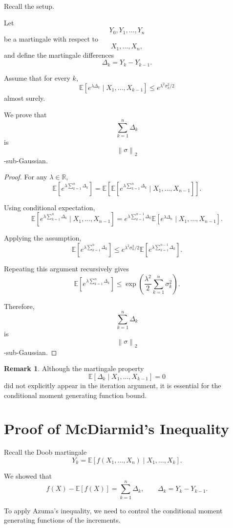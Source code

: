 \documentclass[12pt,oneside]{book}
\numberwithin{equation}{section}
\theoremstyle{definition}
\newtheorem{remark}{Remark}[section]
\theoremstyle{plain}
\theoremstyle{remark}
\newcommand{\R}{\mathbb{R}}
\newcommand{\E}{\mathbb{E}}
\newcommand{\norm}[1]{\left\lVert #1 \right\rVert}
\begin{document}
Recall the setup.

Let
\[
Y_0,Y_1,\dots,Y_n
\]
be a martingale with respect to
\[
X_1,\dots,X_n,
\]
and define the martingale differences
\[
\Delta_k
=
Y_k-Y_{k-1}.
\]

Assume that for every $k$,
\[
\E\left[
e^{\lambda \Delta_k}
\mid
X_1,\dots,X_{k-1}
\right]
\leq
e^{\lambda^2\sigma_k^2/2}
\]
almost surely.

We prove that
\[
\sum_{k=1}^n \Delta_k
\]
is
\[
\norm{\sigma}_2
\]
-sub-Gaussian.

\begin{proof}
For any $\lambda\in\R$,
\[
\E\left[
e^{\lambda\sum_{k=1}^n \Delta_k}
\right]
=
\E\left[
\E\left[
e^{\lambda\sum_{k=1}^n \Delta_k}
\mid
X_1,\dots,X_{n-1}
\right]
\right].
\]

Using conditional expectation,
\[
\E\left[
e^{\lambda\sum_{k=1}^n \Delta_k}
\mid
X_1,\dots,X_{n-1}
\right]
=
e^{\lambda\sum_{k=1}^{n-1}\Delta_k}
\E\left[
e^{\lambda\Delta_n}
\mid
X_1,\dots,X_{n-1}
\right].
\]

Applying the assumption,
\[
\E\left[
e^{\lambda\sum_{k=1}^n \Delta_k}
\right]
\leq
e^{\lambda^2\sigma_n^2/2}
\E\left[
e^{\lambda\sum_{k=1}^{n-1}\Delta_k}
\right].
\]

Repeating this argument recursively gives
\[
\E\left[
e^{\lambda\sum_{k=1}^n \Delta_k}
\right]
\leq
\exp\left(
\frac{\lambda^2}{2}
\sum_{k=1}^n \sigma_k^2
\right).
\]

Therefore,
\[
\sum_{k=1}^n \Delta_k
\]
is
\[
\norm{\sigma}_2
\]
-sub-Gaussian.
\end{proof}

\begin{remark}
Although the martingale property
\[
\E[\Delta_k\mid X_1,\dots,X_{k-1}]=0
\]
did not explicitly appear in the iteration argument, it is essential for the conditional moment generating function bound.
\end{remark}

\section{Proof of McDiarmid's Inequality}

Recall the Doob martingale
\[
Y_k
=
\E[f(X_1,\dots,X_n)\mid X_1,\dots,X_k].
\]

We showed that
\[
f(X)-\E[f(X)]
=
\sum_{k=1}^n \Delta_k,
\qquad
\Delta_k=Y_k-Y_{k-1}.
\]

To apply Azuma's inequality, we need to control the conditional moment generating functions of the increments.
\end{document}
